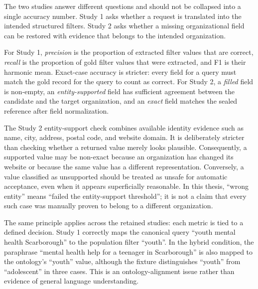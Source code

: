 \documentclass[12pt,oneside]{report}
\begin{document}
The two studies answer different questions and should not be collapsed into a single accuracy number. Study 1 asks whether a request is translated into the intended structured filters. Study 2 asks whether a missing organizational field can be restored with evidence that belongs to the intended organization.

For Study 1, \textit{precision} is the proportion of extracted filter values that are correct, \textit{recall} is the proportion of gold filter values that were extracted, and F1 is their harmonic mean. Exact-case accuracy is stricter: every field for a query must match the gold record for the query to count as correct. For Study 2, a \textit{filled} field is non-empty, an \textit{entity-supported} field has sufficient agreement between the candidate and the target organization, and an \textit{exact} field matches the sealed reference after field normalization.

The Study 2 entity-support check combines available identity evidence such as name, city, address, postal code, and website domain. It is deliberately stricter than checking whether a returned value merely looks plausible. Consequently, a supported value may be non-exact because an organization has changed its website or because the same value has a different representation. Conversely, a value classified as unsupported should be treated as unsafe for automatic acceptance, even when it appears superficially reasonable. In this thesis, ``wrong entity'' means ``failed the entity-support threshold''; it is not a claim that every such case was manually proven to belong to a different organization.

The same principle applies across the retained studies: each metric is tied to a defined decision. Study 1 correctly maps the canonical query ``youth mental health Scarborough'' to the population filter ``youth''. In the hybrid condition, the paraphrase ``mental health help for a teenager in Scarborough'' is also mapped to the ontology's ``youth'' value, although the fixture distinguishes ``youth'' from ``adolescent'' in three cases. This is an ontology-alignment issue rather than evidence of general language understanding.
\end{document}
